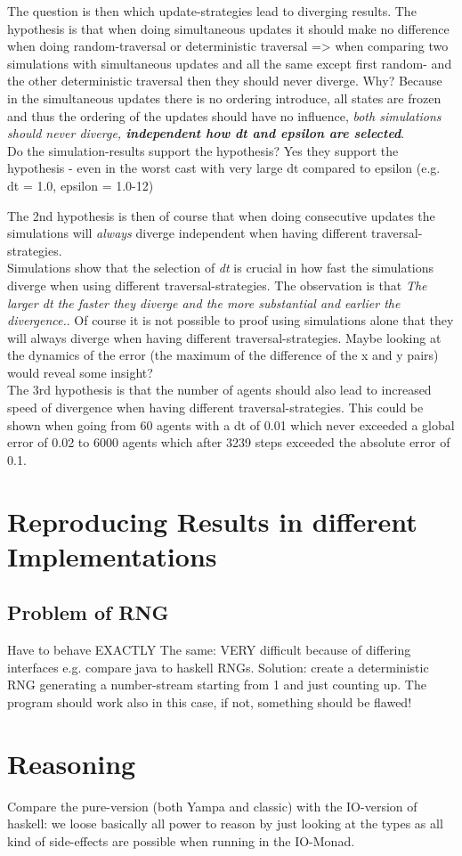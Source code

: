 The question is then which update-strategies lead to diverging results. The hypothesis is that when doing simultaneous updates it should make no difference when doing random-traversal or deterministic traversal => when comparing two simulations with simultaneous updates and all the same except first random- and the other deterministic traversal then they should never diverge. Why? Because in the simultaneous updates there is no ordering introduce, all states are frozen and thus the ordering of the updates should have no influence, \textit{both simulations should never diverge, \textbf{independent how dt and epsilon are selected}}. \\
Do the simulation-results support the hypothesis? Yes they support the hypothesis - even in the worst cast with very large dt compared to epsilon (e.g. dt = 1.0, epsilon = 1.0-12)

The 2nd hypothesis is then of course that when doing consecutive updates the simulations will \textit{always} diverge independent when having different traversal-strategies. \\
Simulations show that the selection of \textit{dt} is crucial in how fast the simulations diverge when using different traversal-strategies. The observation is that \textit{The larger dt the faster they diverge and the more substantial and earlier the divergence.}. Of course it is not possible to proof using simulations alone that they will always diverge when having different traversal-strategies. Maybe looking at the dynamics of the error (the maximum of the difference of the x and y pairs) would reveal some insight? \\

The 3rd hypothesis is that the number of agents should also lead to increased speed of divergence when having different traversal-strategies. This could be shown when going from 60 agents with a dt of 0.01 which never exceeded a global error of 0.02 to 6000 agents which after 3239 steps exceeded the absolute error of 0.1.

\section{Reproducing Results in different Implementations}

\subsection{Problem of RNG}
 Have to behave EXACTLY The same: VERY difficult because of differing interfaces e.g. compare java to haskell RNGs.
 Solution: create a deterministic RNG generating a number-stream starting from 1 and just counting up. The program should work also in this case, if not, something should be flawed!
 
\section{Reasoning}
Compare the pure-version (both Yampa and classic) with the IO-version of haskell: we loose basically all power to reason by just looking at the types as all kind of side-effects are possible when running in the IO-Monad.